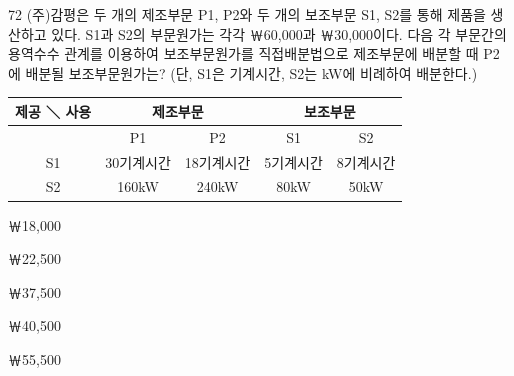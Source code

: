 \begin{question}{72}
(주)감평은 두 개의 제조부문 P1, P2와 두 개의 보조부문 S1, S2를 통해 제품을 생산하고 있다. S1과 S2의 부문원가는 각각 ￦60,000과 ￦30,000이다. 다음 각 부문간의 용역수수 관계를 이용하여 보조부문원가를 직접배분법으로 제조부문에 배분할 때 P2에 배분될 보조부문원가는? (단, S1은 기계시간, S2는 kW에 비례하여 배분한다.)
\par{\small\centering\begin{tabular}{|c|c|c|c|c|}\hline
제공 ＼ 사용 & \multicolumn{2}{c|}{제조부문} & \multicolumn{2}{c|}{보조부문} \tabularnewline\hline
 & P1 & P2 & S1 & S2 \tabularnewline\hline
S1 & 30기계시간 & 18기계시간 & 5기계시간 & 8기계시간 \tabularnewline\hline
S2 & 160kW & 240kW & 80kW & 50kW \tabularnewline\hline
\end{tabular}\par}
\begin{choices}
  \item ￦18,000
  \item ￦22,500
  \item ￦37,500
  \item ￦40,500
  \item ￦55,500
\end{choices}
\end{question}
